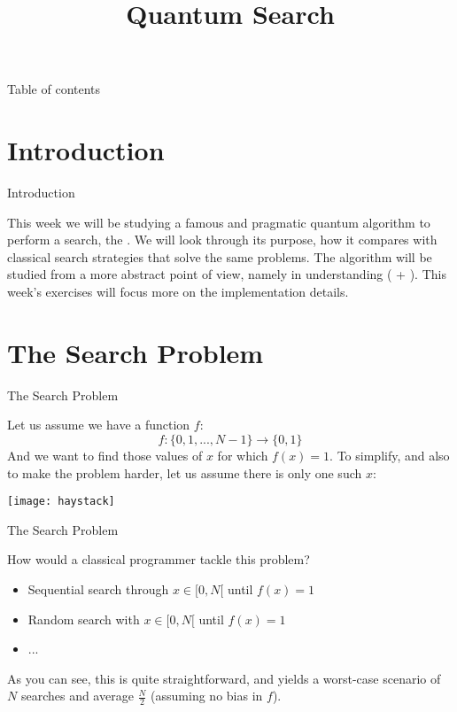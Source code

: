 \documentclass[aspectratio=43]{beamer}
\title{Quantum Search}
\begin{document}
\begin{frame}
	\titlepage
\end{frame}


\begin{frame}{Table of contents}
	\begin{card}
		\tableofcontents
	\end{card}
\end{frame}


\section{Introduction}
\begin{frame}{Introduction}
    \begin{card}
        This week we will be studying a famous and pragmatic quantum algorithm to perform a search, the \textbf{\gvsa}. We will look through its purpose, how it compares with classical search strategies that solve the same problems. The algorithm will be studied from a more abstract point of view, namely in understanding \textbf{\aamp} (\textbf{\phiv} + \textbf{\iatm}). This week's exercises will focus more on the implementation details.
    \end{card}
\pagenumber
\end{frame}


\section{The Search Problem}
\begin{frame}{The Search Problem}
    \begin{cardTiny}
        Let us assume we have a function $f$:
        \begin{equation*}
            f : \{0, 1, ..., N-1\} \rightarrow \{0,1\}
        \end{equation*}
        And we want to find those values of $x$ for which $f(x)=1$. To simplify, and also to make the problem harder, let us assume there is only one such $x$:
    \begin{center}
        \texttt{[image: haystack]}
    \end{center}
    \end{cardTiny}
\pagenumber
\end{frame}

\begin{frame}{The Search Problem}
    \begin{card}
        How would a classical programmer tackle this problem?
        \begin{itemize}
            \item Sequential search through $x \in [0, N[$ until $f(x)=1$
            \item Random search with $x \in [0, N[$ until $f(x)=1$
            \item ...
        \end{itemize}
        As you can see, this is quite straightforward, and yields a worst-case scenario of $N$ searches and average $\frac{N}{2}$ (assuming no bias in $f$).
    \end{card}
\pagenumber
\end{frame}
\end{document}
